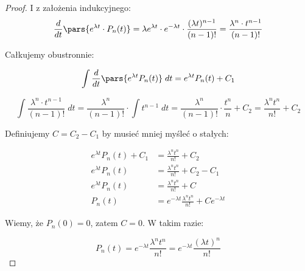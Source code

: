 \begin{proof}
    I z założenia indukcyjnego:
    \[
        \frac{d}{dt}\pars{e^{\lambda t}\cdot P_n(t)} = \lambda e^{\lambda t} \cdot e^{-\lambda t} \cdot \frac{(\lambda t)^{n-1}}{(n-1)!} = \frac{\lambda^n \cdot t^{n-1}}{(n-1)!}
    \]
    
    Całkujemy obustronnie: 
    
    \[
        \int \frac{d}{dt}\pars{e^{\lambda t} P_n(t)} \; dt = e^{\lambda t} P_n(t) + C_1
    \]
    
    \[
        \int \frac{\lambda^n \cdot t^{n-1}}{(n-1)!} \; dt = \frac{\lambda^n}{(n-1)!} \cdot \int t^{n-1} \; dt  = 
        \frac{\lambda^n}{(n-1)!} \cdot \frac{t^n}{n} + C_2 = \frac{\lambda^n t^n}{n!} + C_2
    \]
    
    Definiujemy \(C = C_2 - C_1\) by musieć mniej myśleć o stałych:
    
    \begin{align*}
        e^{\lambda t} P_n(t) + C_1 &= \frac{\lambda^n t^n}{n!} + C_2 \\ 
        e^{\lambda t} P_n(t) &= \frac{\lambda^n t^n}{n!} + C_2 - C_1 \\
        e^{\lambda t} P_n(t) &= \frac{\lambda^n t^n}{n!} + C \\ 
        P_n(t) &= e^{-\lambda t} \frac{\lambda^n t^n}{n!} + C e^{-\lambda t}
    \end{align*}
    
    Wiemy, że \( P_n(0) = 0 \), zatem \(C = 0\). W takim razie:
    
    \[
        P_n(t) = e^{-\lambda t} \frac{\lambda^n t^n}{n!} = e^{-\lambda t} \frac{(\lambda t)^n}{n!}
    \]
    
\end{proof}